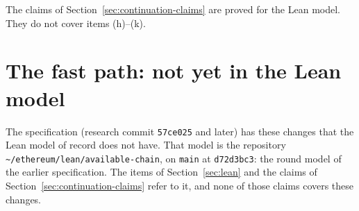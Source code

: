 \documentclass{article}
\begin{document}
The claims of Section~\ref{sec:continuation-claims} are proved for the
Lean model.  They do not cover items (h)--(k).

\section{The fast path: not yet in the Lean model}\label{sec:fast-path}

The specification (research commit \texttt{57ce025} and later) has these
changes that the Lean model of record does not have.  That model is the
repository \texttt{\textasciitilde/ethereum/lean/available-chain}, on
\texttt{main} at \texttt{d72d3bc3}: the round model of the earlier
specification.  The items of Section~\ref{sec:lean} and the claims of
Section~\ref{sec:continuation-claims} refer to it, and none of those
claims covers these changes.
\end{document}
